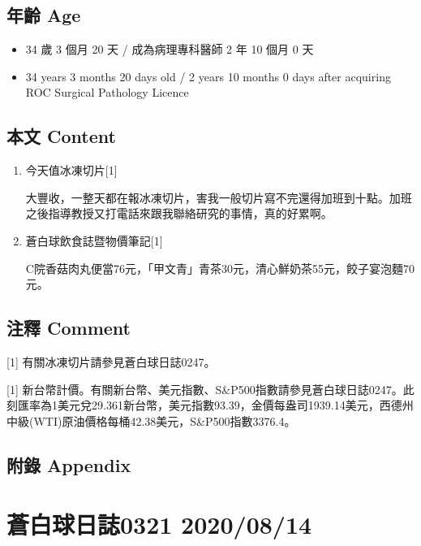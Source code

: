 \documentclass[a5paper, 11pt
]{book}
\providecommand{\tightlist}{%
  \setlength{\itemsep}{0pt}\setlength{\parskip}{0pt}}
\begin{document}
\hypertarget{ux5e74ux9f61-age-63}{%
\subsection{年齡 Age}\label{ux5e74ux9f61-age-63}}

\begin{itemize}
\tightlist
\item
  34 歲 3 個月 20 天 / 成為病理專科醫師 2 年 10 個月 0 天
\item
  34 years 3 months 20 days old / 2 years 10 months 0 days after
  acquiring ROC Surgical Pathology Licence
\end{itemize}

\hypertarget{ux672cux6587-content-63}{%
\subsection{本文 Content}\label{ux672cux6587-content-63}}

\begin{enumerate}
\def\labelenumi{\arabic{enumi}.}
\item
  今天值冰凍切片{[}1{]}

  大豐收，一整天都在報冰凍切片，害我一般切片寫不完還得加班到十點。加班之後指導教授又打電話來跟我聯絡研究的事情，真的好累啊。
\item
  蒼白球飲食誌暨物價筆記{[}1{]}

  C院香菇肉丸便當76元，「甲文青」青茶30元，清心鮮奶茶55元，餃子宴泡麵70元。
\end{enumerate}

\hypertarget{ux6ce8ux91cb-comment-63}{%
\subsection{注釋 Comment}\label{ux6ce8ux91cb-comment-63}}

{[}1{]} 有關冰凍切片請參見蒼白球日誌0247。

{[}1{]}
新台幣計價。有關新台幣、美元指數、S\&P500指數請參見蒼白球日誌0247。此刻匯率為1美元兌29.361新台幣，美元指數93.39，金價每盎司1939.14美元，西德州中級(WTI)原油價格每桶42.38美元，S\&P500指數3376.4。

\hypertarget{ux9644ux9304-appendix-63}{%
\subsection{附錄 Appendix}\label{ux9644ux9304-appendix-63}}

\hypertarget{ux84bcux767dux7403ux65e5ux8a8c0321-20200814}{%
\section{蒼白球日誌0321
2020/08/14}\label{ux84bcux767dux7403ux65e5ux8a8c0321-20200814}}
\end{document}
